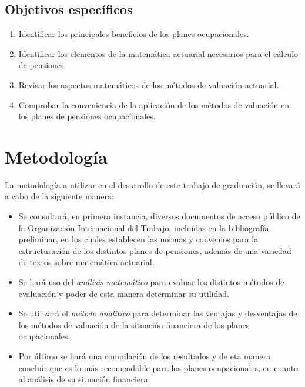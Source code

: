 \documentclass[12pt,letterpaper,titlepage]{article}
\begin{document}
\subsection{Objetivos específicos}

\begin{enumerate}
	\item Identificar los principales beneficios de los planes ocupacionales.
	\item Identificar los elementos de la matemática actuarial necesarios para el cálculo de pensiones.
	\item Revisar los aspectos matemáticos de los métodos de valuación actuarial.
	\item Comprobar la conveniencia de la aplicación de los métodos de valuación en los planes de pensiones ocupacionales. 
\end{enumerate}

\newpage

\section{Metodología}

La metodología a utilizar en el desarrollo de este trabajo de graduación, se llevará a cabo de la siguiente manera:

\begin{itemize}
	\item Se consultará, en primera instancia, diversos documentos de acceso público de la Organización Internacional del Trabajo, incluídas en la bibliografía preliminar,  en los cuales establecen las normas y convenios para la estructuración de los distintos planes de pensiones, además de una variedad de textos sobre matemática actuarial.
	
	\item Se hará uso del \textit{análisis matemático} para evaluar los distintos métodos de evaluación y poder de esta manera determinar su utilidad.
	 
	\item Se utilizará el \textit{método analítico} para determinar las ventajas y desventajas de los métodos de valuación de la situación financiera de los planes ocupacionales.
	
	\item Por último se hará una compilación de los resultados y de eta manera concluir que es lo más recomendable para los planes ocupacionales, en cuanto al análisis de su situación financiera.
\end{itemize}
\end{document}
